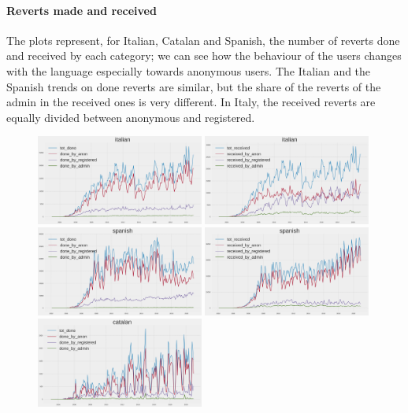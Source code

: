 \paragraph*{Reverts made and received}
The plots represent, for Italian, Catalan and Spanish, the number of reverts done and received by
each category; we can see how the behaviour of the users changes with the language especially
towards anonymous users. The Italian and the Spanish trends on done reverts are similar, but the share of
the reverts of the admin in the received ones is very different. In Italy, the received reverts are
equally divided between anonymous and registered.  
\begin{figure}[H]
    \centering
    \includegraphics[width=0.49\textwidth]{./chapters/04/assets/revert_done_it.png}
    \includegraphics[width=0.49\textwidth]{./chapters/04/assets/revert_received_it.png}
    \includegraphics[width=0.49\textwidth]{./chapters/04/assets/revert_done_es.png}
    \includegraphics[width=0.49\textwidth]{./chapters/04/assets/revert_received_es.png}
    \includegraphics[width=0.49\textwidth]{./chapters/04/assets/revert_done_ca.png}

\end{figure}
